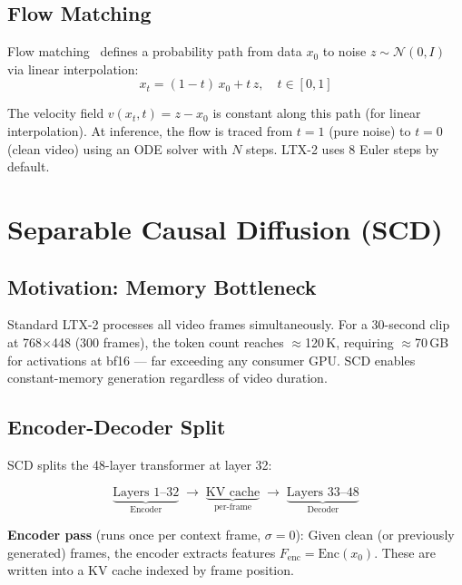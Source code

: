 \documentclass[10pt,twocolumn]{article}
\begin{document}
\subsection{Flow Matching}

Flow matching~\cite{lipman2022flow} defines a probability path from data $x_0$ to noise $z \sim \mathcal{N}(0,I)$ via linear interpolation:
\begin{equation}
  x_t = (1-t)\,x_0 + t\,z, \quad t \in [0,1]
\end{equation}

The velocity field $v(x_t, t) = z - x_0$ is constant along this path (for linear interpolation). At inference, the flow is traced from $t=1$ (pure noise) to $t=0$ (clean video) using an ODE solver with $N$ steps. LTX-2 uses 8 Euler steps by default.

\section{Separable Causal Diffusion (SCD)}
\label{sec:scd}

\subsection{Motivation: Memory Bottleneck}

Standard LTX-2 processes all video frames simultaneously. For a 30-second clip at 768$\times$448 (300 frames), the token count reaches $\approx$120\,K, requiring $\approx$70\,GB for activations at bf16 — far exceeding any consumer GPU. SCD enables constant-memory generation regardless of video duration.

\subsection{Encoder-Decoder Split}

SCD splits the 48-layer transformer at layer 32:

\begin{equation}
\underbrace{\text{Layers 1--32}}_{\text{Encoder}} \;\longrightarrow\; \underbrace{\text{KV cache}}_{\text{per-frame}} \;\longrightarrow\; \underbrace{\text{Layers 33--48}}_{\text{Decoder}}
\end{equation}

\textbf{Encoder pass} (runs once per context frame, $\sigma=0$):
Given clean (or previously generated) frames, the encoder extracts features $F_{\text{enc}} = \text{Enc}(x_0)$. These are written into a KV cache indexed by frame position.
\end{document}
